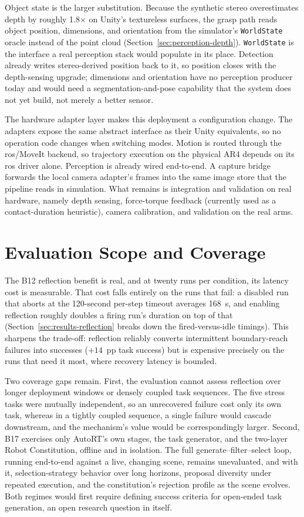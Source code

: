 Object state is the larger substitution. Because the synthetic stereo overestimates depth by roughly 1.8$\times$ on Unity’s textureless surfaces, the grasp path reads object position, dimensions, and orientation from the simulator’s \texttt{WorldState} oracle instead of the point cloud (Section~\ref{sec:perception-depth}). \texttt{WorldState} is the interface a real perception stack would populate in its place. Detection already writes stereo-derived position back to it, so position closes with the depth-sensing upgrade; dimensions and orientation have no perception producer today and would need a segmentation-and-pose capability that the system does not yet build, not merely a better sensor.

The hardware adapter layer makes this deployment a configuration change. The adapters expose the same abstract interface as their Unity equivalents, so no operation code changes when switching modes. Motion is routed through the \gls{ros}/MoveIt backend, so trajectory execution on the physical AR4 depends on its \gls{ros} driver alone. Perception is already wired end-to-end. A capture bridge forwards the local camera adapter’s frames into the same image store that the pipeline reads in simulation. What remains is integration and validation on real hardware, namely depth sensing, force-torque feedback (currently used as a contact-duration heuristic), camera calibration, and validation on the real arms.

\section{Evaluation Scope and Coverage}
The B12 reflection benefit is real, and at twenty runs per condition, its latency cost is measurable. That cost falls entirely on the runs that fail: a disabled run that aborts at the 120-second per-step timeout averages 168~s, and enabling reflection roughly doubles a firing run's duration on top of that (Section~\ref{sec:results-reflection} breaks down the fired-versus-idle timings). This sharpens the trade-off: reflection reliably converts intermittent boundary-reach failures into successes ($+14$~pp task success) but is expensive precisely on the runs that need it most, where recovery latency is bounded.

Two coverage gaps remain. First, the evaluation cannot assess reflection over longer deployment windows or densely coupled task sequences. The five stress tasks were mutually independent, so an unrecovered failure cost only its own task, whereas in a tightly coupled sequence, a single failure would cascade downstream, and the mechanism’s value would be correspondingly larger. Second, B17 exercises only AutoRT’s own stages, the task generator, and the two-layer Robot Constitution, offline and in isolation. The full generate–filter–select loop, running end-to-end against a live, changing scene, remains unevaluated, and with it, selection-strategy behavior over long horizons, proposal diversity under repeated execution, and the constitution’s rejection profile as the scene evolves. Both regimes would first require defining success criteria for open-ended task generation, an open research question in itself.

